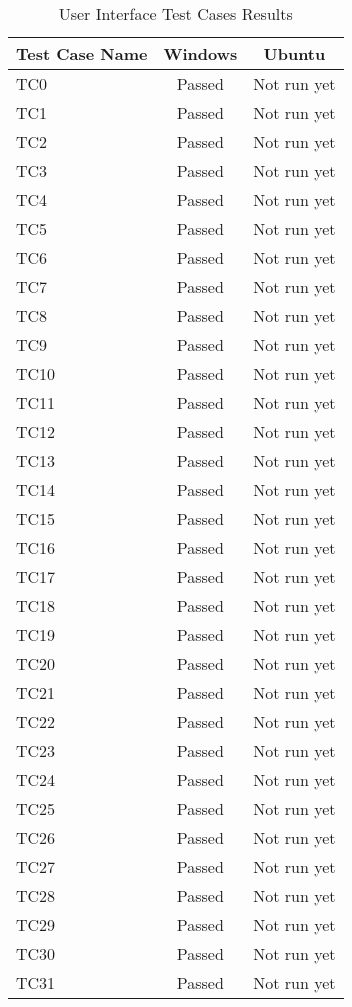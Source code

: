 \begin{table}[!ht]
\begin{center}
\begin{tabular}{|l|c|c|}
	\hline
	{ \bf Test Case Name } & { \bf Windows } & { \bf Ubuntu } \\
	\hline \hline
	TC0      & Passed & Not run yet  \\
	TC1      & Passed & Not run yet  \\
   TC2      & Passed & Not run yet  \\
   TC3      & Passed & Not run yet  \\
   TC4      & Passed & Not run yet  \\
   TC5      & Passed & Not run yet  \\
   TC6      & Passed & Not run yet  \\
   TC7      & Passed & Not run yet  \\
   TC8      & Passed & Not run yet  \\
   TC9      & Passed & Not run yet  \\
   TC10     & Passed & Not run yet  \\
   TC11     & Passed & Not run yet  \\
   TC12     & Passed & Not run yet  \\
   TC13     & Passed & Not run yet  \\
   TC14     & Passed & Not run yet  \\
   TC15     & Passed & Not run yet  \\
   TC16     & Passed & Not run yet  \\
   TC17     & Passed & Not run yet  \\
   TC18     & Passed & Not run yet  \\
   TC19     & Passed & Not run yet  \\
   TC20     & Passed & Not run yet  \\
   TC21     & Passed & Not run yet  \\
   TC22     & Passed & Not run yet  \\
   TC23     & Passed & Not run yet  \\
   TC24     & Passed & Not run yet  \\
   TC25     & Passed & Not run yet  \\
   TC26     & Passed & Not run yet  \\
   TC27     & Passed & Not run yet  \\
   TC28     & Passed & Not run yet  \\
   TC29     & Passed & Not run yet  \\
   TC30     & Passed & Not run yet  \\
   TC31     & Passed & Not run yet  \\
	\hline
\end{tabular}
\caption{User Interface Test Cases Results}
\label{tab:UITCResults}
\end{center}
\end{table}
